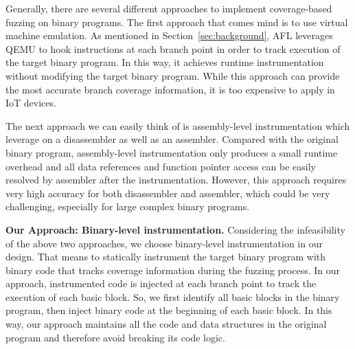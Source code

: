 Generally, there are several different approaches to implement coverage-based fuzzing on binary programs. The first approach that comes mind is to use virtual machine emulation. As mentioned in Section~\ref{sec:background}, AFL leverages QEMU to hook instructions at each branch point in order to track execution of the target binary program. In this way, it achieves runtime instrumentation without modifying the target binary program. While this approach can provide the most accurate branch coverage information, it is too expensive to apply in IoT devices.

The next approach we can easily think of is assembly-level instrumentation which leverage on a disassembler as well as an assembler. Compared with the original binary program, assembly-level instrumentation only produces a small runtime overhead and all data references and function pointer access can be easily resolved by assembler after the instrumentation. However, this approach requires very high accuracy for both disassembler and assembler, which could be very challenging, especially for large complex binary programs.






{\bf Our Approach: Binary-level instrumentation.}
Considering the infeasibility of the above two approaches, we choose binary-level instrumentation in our design. That means to statically instrument the target binary program with binary code that tracks coverage information during the fuzzing process. In our approach, instrumented code is injected at each branch point to track the execution of each basic block. So, we first identify all basic blocks in the binary program, then inject binary code at the beginning of each basic block. In this way, our approach maintains all the code and data structures in the original program and therefore avoid breaking its code logic.

